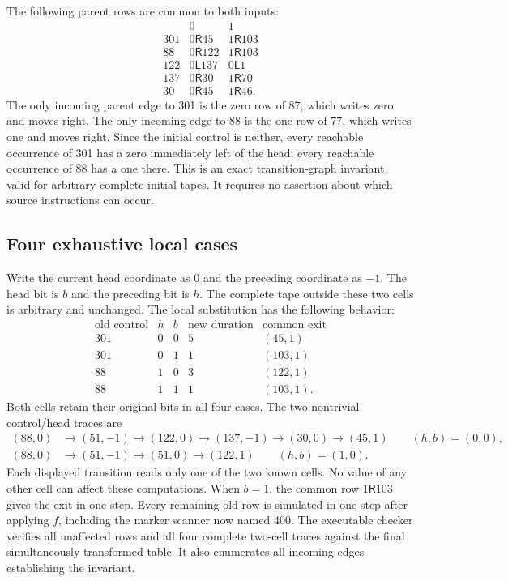The following parent rows are common to both inputs:
\[
\begin{array}{c|cc}
 &0&1\\\hline
301&0\mathsf R45&1\mathsf R103\\
88&0\mathsf R122&1\mathsf R103\\
122&0\mathsf L137&0\mathsf L1\\
137&0\mathsf R30&1\mathsf R70\\
30&0\mathsf R45&1\mathsf R46.
\end{array}
\]
The only incoming parent edge to 301 is the zero row of 87, which writes
zero and moves right.  The only incoming edge to 88 is the one row of 77,
which writes one and moves right.  Since the initial control is neither,
every reachable occurrence of 301 has a zero immediately left of the head;
every reachable occurrence of 88 has a one there.  This is an exact
transition-graph invariant, valid for arbitrary complete initial tapes.
It requires no assertion about which source instructions can occur.

\subsection{Four exhaustive local cases}
Write the current head coordinate as 0 and the preceding coordinate as
$-1$.  The head bit is $b$ and the preceding bit is $h$.  The complete tape
outside these two cells is arbitrary and unchanged.  The local substitution
has the following behavior:
\[
\begin{array}{ccccc}
\text{old control}&h&b&\text{new duration}&\text{common exit}\\\hline
301&0&0&5&(45,1)\\
301&0&1&1&(103,1)\\
88&1&0&3&(122,1)\\
88&1&1&1&(103,1).
\end{array}
\]
Both cells retain their original bits in all four cases.  The two nontrivial
control/head traces are
\[
\begin{split}
 (88,0)&\longrightarrow(51,-1)\longrightarrow(122,0)
 \longrightarrow(137,-1)\longrightarrow(30,0)
 \longrightarrow(45,1) \qquad(h,b)=(0,0),\\
 (88,0)&\longrightarrow(51,-1)\longrightarrow(51,0)
 \longrightarrow(122,1) \qquad(h,b)=(1,0).
\end{split}
\]
Each displayed transition reads only one of the two known cells.  No value
of any other cell can affect these computations.  When $b=1$, the common
row $1\mathsf R103$ gives the exit in one step.  Every remaining old row is
simulated in one step after applying $f$, including the marker scanner now
named 400.  The executable checker verifies all unaffected rows and all
four complete two-cell traces against the final simultaneously transformed
table.  It also enumerates all incoming edges establishing the invariant.

